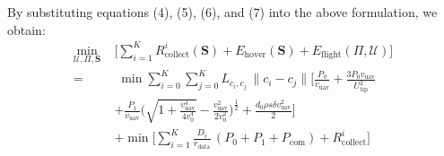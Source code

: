 \documentclass[sigconf]{acmart}
\begin{document}
By substituting equations (4), (5), (6), and (7) into the above formulation, we obtain:
\begin{equation}
    \begin{aligned}
    \min_{\mathcal{U},\Pi,\mathbf{S}} \; &\Biggl[\sum_{i=1}^K R_{\mathrm{collect}}^i(\mathbf{S}) 
    + E_{\mathrm{hover}}(\mathbf{S}) + E_{\mathrm{flight}}(\Pi,\mathcal{U})\Biggr] \\
    =&\; \min \sum_{i=0}^{K}\sum_{j=0}^{K} L_{c_i,c_j}\,\|c_{i}-c_{j}\|\Biggl[\frac{P_{0}}{v_{\mathrm{uav}}}
    + \frac{3P_{0}v_{\mathrm{uav}}}{U_{\mathrm{tip}}^{2}} \\
    &+ \frac{P_{1}}{v_{\mathrm{uav}}} \Biggl( \sqrt{1 + \frac{v_{\mathrm{uav}}^{4}}{4v_{0}^{4}}} - \frac{v_{\mathrm{uav}}^{2}}{2v_{0}^{2}} \Biggr)^{\frac{1}{2}}
    + \frac{d_{0}\rho s\delta v_{\mathrm{uav}}^{2}}{2} \Biggr] \\
    &+ \min \Biggl[\sum_{i=1}^{K} \frac{D_{i}}{r_{\mathrm{data}}}\,(P_0 + P_1 + P_{\mathrm{com}}) + R_{\mathrm{collect}}^i \Biggr]
    \end{aligned}
\end{equation}
\end{document}
